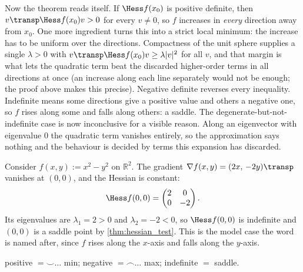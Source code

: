 \begin{remark}
Now the theorem reads itself. If $\Hess f(x_0)$ is positive definite, then
$v\transp \Hess f(x_0) v > 0$ for every $v \neq 0$, so $f$ increases in \emph{every} direction
away from $x_0$. One more ingredient turns this into a strict local minimum: the increase has to
be uniform over the directions. Compactness of the unit sphere supplies a single $\lambda > 0$ with
$v\transp \Hess f(x_0) v \geq \lambda|v|^2$ for all $v$, and that margin is what lets the
quadratic term beat the discarded higher-order terms in all directions at once (an increase along
each line separately would not be enough; the proof above makes this precise). Negative definite reverses every
inequality. Indefinite means some directions give a positive value and others a negative one, so
$f$ rises along some and falls along others: a saddle. The degenerate-but-not-indefinite case is
now inconclusive for a visible reason. Along an eigenvector with eigenvalue $0$ the quadratic
term vanishes entirely, so the approximation says nothing and the behaviour is decided by terms
this expansion has discarded.
\end{remark}

\begin{aiexample}
\label{ex:ai_saddle_via_hessian}
Consider $f(x,y) := x^2-y^2$ on $\mathbb{R}^2$. The gradient
$\nabla f(x,y) = (2x,\,-2y)\transp$ vanishes at $(0,0)$, and the Hessian is constant:
\[
\Hess f(0,0) = \begin{pmatrix} 2 & 0 \\ 0 & -2 \end{pmatrix}.
\]
Its eigenvalues are $\lambda_1 = 2 > 0$ and $\lambda_2 = -2 < 0$, so $\Hess f(0,0)$ is
indefinite and $(0,0)$ is a saddle point by \cref{thm:hessian_test}. This is the model case the
word  is named after, since $f$ rises along the $x$-axis and falls along the $y$-axis.
\end{aiexample}

\begin{remark}[Mnemonic]
positive $= \smile \dots$ min; negative $= \frown \dots$ max; indefinite $=$ saddle.
\end{remark}

